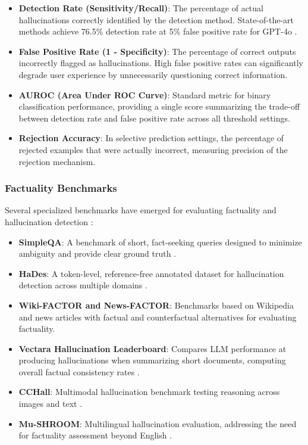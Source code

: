 \begin{itemize}
    \item \textbf{Detection Rate (Sensitivity/Recall)}: The percentage of actual hallucinations correctly identified by the detection method. State-of-the-art methods achieve 76.5\% detection rate at 5\% false positive rate for GPT-4o \citep{relai2024sota}.
    
    \item \textbf{False Positive Rate (1 - Specificity)}: The percentage of correct outputs incorrectly flagged as hallucinations. High false positive rates can significantly degrade user experience by unnecessarily questioning correct information.
    
    \item \textbf{AUROC (Area Under ROC Curve)}: Standard metric for binary classification performance, providing a single score summarizing the trade-off between detection rate and false positive rate across all threshold settings.
    
    \item \textbf{Rejection Accuracy}: In selective prediction settings, the percentage of rejected examples that were actually incorrect, measuring precision of the rejection mechanism.
\end{itemize}

\subsubsection{Factuality Benchmarks}

Several specialized benchmarks have emerged for evaluating factuality and hallucination detection \citep{huang2023survey}:

\begin{itemize}
    \item \textbf{SimpleQA}: A benchmark of short, fact-seeking queries designed to minimize ambiguity and provide clear ground truth \citep{openai2024simpleqa}.
    
    \item \textbf{HaDes}: A token-level, reference-free annotated dataset for hallucination detection across multiple domains \citep{huang2023survey}.
    
    \item \textbf{Wiki-FACTOR and News-FACTOR}: Benchmarks based on Wikipedia and news articles with factual and counterfactual alternatives for evaluating factuality.
    
    \item \textbf{Vectara Hallucination Leaderboard}: Compares LLM performance at producing hallucinations when summarizing short documents, computing overall factual consistency rates \citep{github2024vectara}.
    
    \item \textbf{CCHall}: Multimodal hallucination benchmark testing reasoning across images and text \citep{huang2023survey}.
    
    \item \textbf{Mu-SHROOM}: Multilingual hallucination evaluation, addressing the need for factuality assessment beyond English \citep{huang2023survey}.
\end{itemize}

